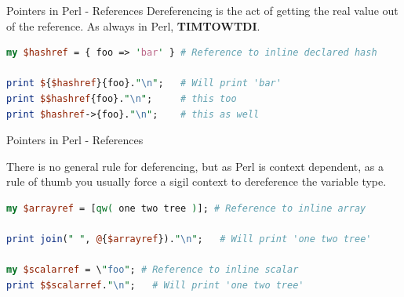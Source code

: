 \documentclass[10pt]{beamer}
\begin{document}


\begin{frame}[fragile]{Pointers in Perl - References}
Dereferencing is the act of getting the real value out of the reference. \newline
As always in Perl, \textbf{TIMTOWTDI}.
\begin{lstlisting}[language=perl]
my $hashref = { foo => 'bar' } # Reference to inline declared hash

print ${$hashref}{foo}."\n";   # Will print 'bar'
print $$hashref{foo}."\n";     # this too
print $hashref->{foo}."\n";    # this as well
\end{lstlisting}
\end{frame}

\begin{frame}[fragile]{Pointers in Perl - References}


There is no general rule for deferencing, but as Perl is context dependent, as a rule of thumb you usually force a sigil context to dereference the variable type.
\begin{lstlisting}[language=perl]
my $arrayref = [qw( one two tree )]; # Reference to inline array

print join(" ", @{$arrayref})."\n";   # Will print 'one two tree'

my $scalarref = \"foo"; # Reference to inline scalar
print $$scalarref."\n";   # Will print 'one two tree'
\end{lstlisting}

\end{frame}
\end{document}
